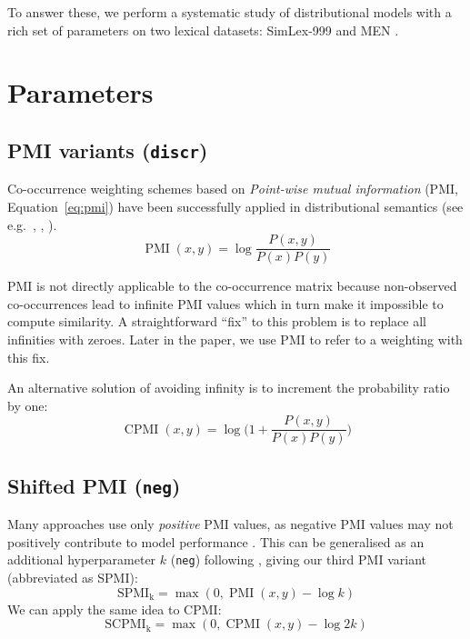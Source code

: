 \documentclass[11pt]{article}
\begin{document}
To answer these, we perform a systematic study of distributional models with a rich set of parameters on two lexical datasets: SimLex-999 \cite{hill2014simlex} and MEN \cite{Bruni:2014:MDS:2655713.2655714}.

\section{Parameters}
\label{sec:parameters}



\subsection{PMI variants (\texttt{discr})}
\label{sec:pmi-variants}

Co-occurrence weighting schemes based on \emph{Point-wise mutual information} (PMI, Equation~\ref{eq:pmi}) have been successfully applied in distributional semantics (see e.g.~, , ).
%
\begin{equation}
  \label{eq:pmi}
  \operatorname{PMI}(x, y) = \log\frac{P(x,y)}{P(x)P(y)}
\end{equation}

PMI is not directly applicable to the co-occurrence matrix because non-observed co-occurrences lead to infinite PMI values which in turn make it impossible to compute similarity. A straightforward ``fix'' to this problem is to replace all infinities with zeroes. Later in the paper, we use PMI to refer to a weighting with this fix.

An alternative solution of avoiding infinity is to increment the probability ratio by one:
%
\begin{equation}
  \label{eq:cpmi}
  \operatorname{CPMI}(x, y) = \log\Big( 1 + \frac{P(x,y)}{P(x)P(y)} \Big)
\end{equation}



\subsection{Shifted PMI (\texttt{neg})}
\label{sec:shifted-pmi}

Many approaches use only \emph{positive} PMI values, as  negative PMI values may not positively contribute to model performance \cite{Turney:2010:FMV:1861751.1861756}. This can be generalised as an additional hyperparameter $k$ (\texttt{neg}) following , giving our third PMI variant (abbreviated as SPMI):
%
\begin{equation}
  \label{eq:ppmi}
  \operatorname{SPMI_k} = \max (0, \operatorname{PMI}(x, y) - \log k)
\end{equation}
%
We can apply the same idea to CPMI:
%
\begin{equation}
  \label{eq:pcpmi}
  \operatorname{SCPMI_k} = \max (0, \operatorname{CPMI}(x, y) - \log 2k)
\end{equation}
\end{document}
